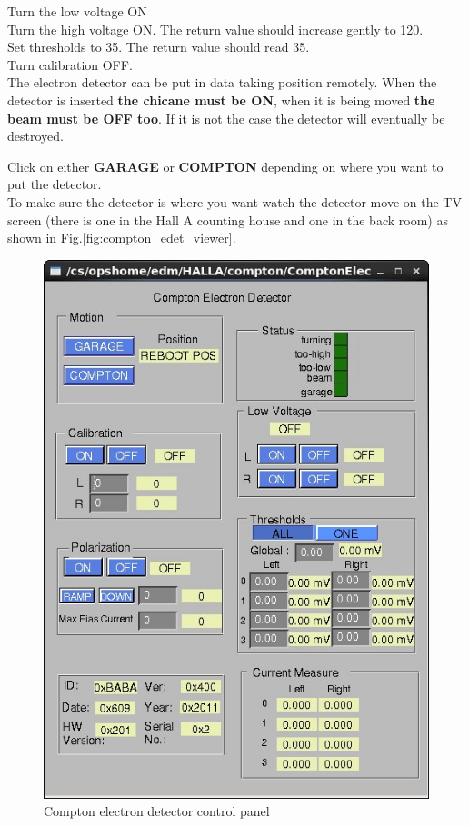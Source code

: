 \begin{itemize}
Turn the low voltage ON\\
Turn the high voltage ON. The return value should increase gently to 120.\\
Set thresholds to 35. The return value should read 35.\\
Turn calibration OFF.\\

The electron detector can be put in data
taking position remotely. When the detector is inserted {\bf the chicane must be ON},
when it is being moved {\bf the beam must be OFF too}. If it is not the case the detector will eventually be destroyed.

Click on either {\bf GARAGE} or {\bf COMPTON} depending on where you want to put the 
detector.\\

To make sure the detector is where you want watch the detector move on the TV screen  (there is one in the Hall A counting house and one in the back room) as shown in Fig.\ref{fig:compton_edet_viewer}.\\
	
\begin{figure}[htp]
    \begin{center}
        \includegraphics*[angle=0,scale=0.8]{compton_epicsElectron}
    \end{center}
    \caption[compton:Electron detector control]{Compton electron detector control panel}
    \label{fig:compton_epicsElectron}
\end{figure}


\end{itemize}
